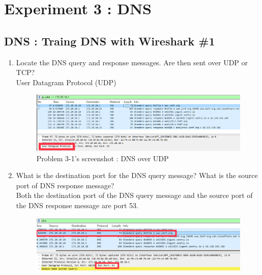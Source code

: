\section{Experiment 3 : DNS}
\subsection{DNS : Traing DNS with Wireshark \#1}
    \begin{enumerate}[label=\bfseries Problem \arabic*:,leftmargin=*,labelindent=1em]
        \item Locate the DNS query and response messages. Are then sent over UDP or TCP?\\[0.2mm]
            \soln User Datagram Protocol (UDP)
            \vspace{-2mm}  
            \begin{figure}[!h]\centering
            \hspace{10mm} 
        		\includegraphics[width=.78\textwidth]{image/result_week01/Q3-1.png}
        		\caption{\footnotesize Problem 3-1's screenshot : DNS over UDP}
        		\vspace{-10pt}
            \end{figure}
        \item What is the destination port for the DNS query message? 
        What is the source port of DNS response message?\\[0.2mm]
            \soln Both the destination port of the DNS query message and the source port of the DNS response message are port 53.
            \vspace{-2mm}  
            \begin{figure}[!h]\centering
            \hspace{10mm} 
        		\includegraphics[width=.78\textwidth]{image/result_week01/Q3-2-1.png}

\end{figure}
\end{enumerate}
